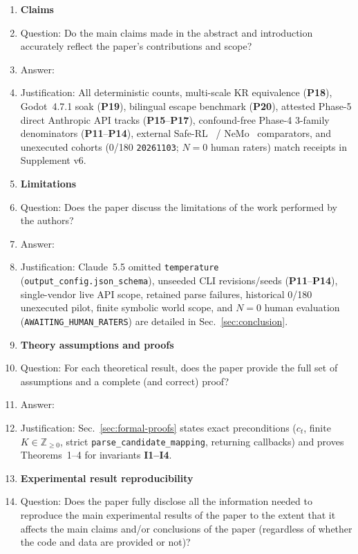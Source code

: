 \documentclass{article}
\begin{document}
\begin{enumerate}
\item {\bf Claims}
    \item[] Question: Do the main claims made in the abstract and introduction accurately reflect the paper's contributions and scope?
    \item[] Answer: \answerYes{}
    \item[] Justification: All deterministic counts, multi-scale KR equivalence (\textbf{P18}), Godot~4.7.1 soak (\textbf{P19}), bilingual escape benchmark (\textbf{P20}), attested Phase-5 direct Anthropic API tracks (\textbf{P15}--\textbf{P17}), confound-free Phase-4 3-family denominators (\textbf{P11}--\textbf{P14}), external Safe-RL~\cite{alshiekh2018shield} / NeMo~\cite{rebedea2023nemo} comparators, and unexecuted cohorts (0/180 \texttt{20261103}; $N{=}0$ human raters) match receipts in Supplement v6.
\item {\bf Limitations}
    \item[] Question: Does the paper discuss the limitations of the work performed by the authors?
    \item[] Answer: \answerYes{}
    \item[] Justification: Claude~5.5 omitted \texttt{temperature} (\texttt{output\_config.json\_schema}), unseeded CLI revisions/seeds (\textbf{P11}--\textbf{P14}), single-vendor live API scope, retained parse failures, historical 0/180 unexecuted pilot, finite symbolic world scope, and $N{=}0$ human evaluation (\texttt{AWAITING\_}\allowbreak\texttt{HUMAN\_}\allowbreak\texttt{RATERS}) are detailed in Sec.~\ref{sec:conclusion}.
\item {\bf Theory assumptions and proofs}
    \item[] Question: For each theoretical result, does the paper provide the full set of assumptions and a complete (and correct) proof?
    \item[] Answer: \answerYes{}
    \item[] Justification: Sec.~\ref{sec:formal-proofs} states exact preconditions ($c_t$, finite $K\in\mathbb{Z}_{\geq 0}$, strict \texttt{parse\_}\allowbreak\texttt{candidate\_}\allowbreak\texttt{mapping}, returning callbacks) and proves Theorems~1--4 for invariants \textbf{I1--I4}.
\item {\bf Experimental result reproducibility}
    \item[] Question: Does the paper fully disclose all the information needed to reproduce the main experimental results of the paper to the extent that it affects the main claims and/or conclusions of the paper (regardless of whether the code and data are provided or not)?

\end{enumerate}
\end{document}
